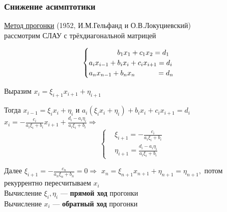\subsubsection{Снижение асимптотики}

\underline{Метод прогонки} (1952, И.М.Гельфанд и О.В.Локуциевский)\\рассмотрим СЛАУ с трёхдиагональной матрицей

\[
\begin{cases} 
\quad\quad\quad\quad b_1 x_1 + c_1 x_2= d_1 \\ 
a_i x_{i-1}\space\space + b_i x_i + c_i x_{i+1} = d_i \\ 
a_n x_{n-1} + b_n x_n\quad\quad\quad = d_n 
\end{cases}
\]



Выразим \(x_i=\xi_{i+1} x_{i+1}+\eta_{i+1}\)

Тогда \(x_{i-1}=\xi_{i}x_i+\eta_i\) и \(a_i(\xi_ix_i+\eta_i)+b_ix_i+c_ix_{i+1}=d_i\) \Rightarrow \(x_i = -\frac{c_i}{a_i \xi_i + b_i} x_{i+1} + \frac{d_i - a_i \eta_i}{a_i \xi_i + b_i} \Rightarrow\) \Rightarrow
\[
\left\{
\begin{aligned}
&\xi_{i+1} = -\frac{c_i}{a_i \xi_i + b_i} \\
&\eta_{i+1} = \frac{d_i - a_i \eta_i}{a_i \xi_i + b_i}
\end{aligned}
\right.
\]


Далее \( \xi_{i+1} = -\frac{c_n}{a_n \xi_n + b_n}=0 \Rightarrow \) \( x_n = \xi_{n+1} x_{n+1} + \eta_{n+1} = \eta_{n+1}, \) потом рекуррентно пересчитываем \( x_i \)\\
Вычисление \(\xi_i,\eta_i\) — \textbf{прямой ход} прогонки\\
Вычисление \(x_i\) — \textbf{обратный ход} прогонки

